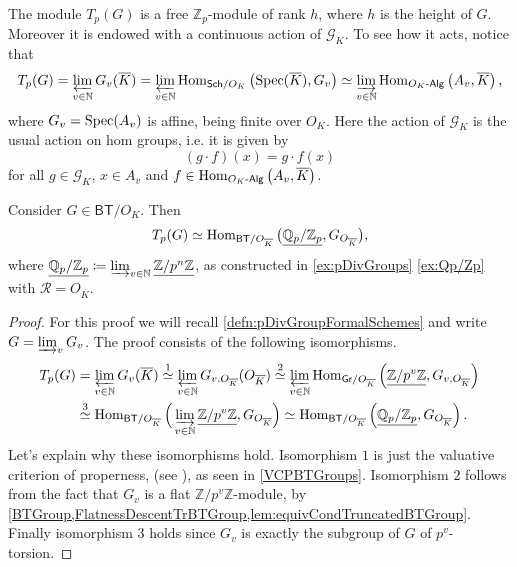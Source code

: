\begin{rem}[]\label{rem:TateModuleProperties}
	The module $T_p(G)$ is a free $\mathbb{Z}_{p}$-module of rank $h$,
	where $h$ is the height of $G$.
	Moreover it is endowed with a continuous action of $\mathscr{G}_K$.
	To see how it acts, notice that
	\begin{equation*}
		T_p(G) = \varprojlim_{v \in \mathbb{N}} G_v(\overline{K}) =
		\varprojlim_{v \in \mathbb{N}} \operatorname{Hom}_{ \mathsf{Sch}/O_K } 
		\left( \operatorname{Spec}(\overline{K}), G_v \right) \simeq
		\varinjlim_{v \in \mathbb{N}} \operatorname{Hom}_{ O_K\text{-}\mathsf{Alg} }
		\left( A_v, \overline{K} \right)
	,\end{equation*}
	where $G_v = \operatorname{Spec}(A_v)$ is affine, being finite over $O_K$.
	Here the action of $\mathscr{G}_K$ is the usual action on hom
	groups, i.e$.$ it is given by
	\begin{equation*}
		\left( g \cdot f \right)(x) = g \cdot f(x)
	\end{equation*}
	for all $g \in \mathscr{G}_K$, $x \in A_v$ and $f \in \operatorname{Hom}_{ O_K\text{-}\mathsf{Alg} } 
	\left( A_v, \overline{K}\right)$.
\end{rem}


\begin{prop}[]\label{AlternativeDefnTateModule}
	Consider $G \in \mathsf{BT}/O_K$.
	Then
	\begin{equation*}
		T_p(G) \simeq \operatorname{Hom}_{ \mathsf{BT}/O_{\overline{K}} }
		\big( \underline{\mathbb{Q}_p/\mathbb{Z}_{p}}, G_{O_{\overline{K}}} \big)
	,\end{equation*}
	where $\underline{\mathbb{Q}_p/\mathbb{Z}_{p}} \coloneqq \varinjlim_{v \in \mathbb{N}}
	\underline{\mathbb{Z}/p^n\mathbb{Z}}$, as constructed 
	in \cref{ex:pDivGroups} \cref{ex:Qp/Zp} with $\mathscr{R} = O_{\overline{K}}$.
\end{prop}
\begin{proof}
	For this proof we will recall \cref{defn:pDivGroupFormalSchemes}
	and write $G = \varinjlim_v G_v$.
	The proof consists of the following isomorphisms.
	\begin{align*}
		T_p(G) &= \varprojlim_{v \in \mathbb{N}} G_v(\overline{K})
		\stackrel{1}{\simeq} \varprojlim_{v \in \mathbb{N}} G_{ v,O_{\overline{K}}}(O_{\overline{K}})
		\stackrel{2}{\simeq} \varprojlim_{v \in \mathbb{N}}
		\operatorname{Hom}_{ \mathsf{Gr}/O_{\overline{K}} }
		\left( \underline{\mathbb{Z}/p^v\mathbb{Z}}, G_{ v,O_{\overline{K}}} \right) \\
		&\stackrel{3}{\simeq} 
		\operatorname{Hom}_{ \mathsf{BT}/O_{\overline{K}} } 
		\Big( \varinjlim_{v \in \mathbb{N}} \underline{\mathbb{Z}/p^v\mathbb{Z}}, G_{O_{\overline{K}}} \Big)
		\simeq \operatorname{Hom}_{ \mathsf{BT}/O_{\overline{K}} } 
		\left( \underline{\mathbb{Q}_p/\mathbb{Z}_{p}}, G_{O_{\overline{K}}} \right)
	.\end{align*}
	Let's explain why these isomorphisms hold.
	Isomorphism $1$ is just 
	the valuative criterion of properness,
	(see \cite[Chapter II, theorem 4.7]{Hartshorne}),
	as seen in \cref{VCPBTGroups}.
	Isomorphism $2$ follows from the fact that $G_v$ is
	a flat $\mathbb{Z}/p^v\mathbb{Z}$-module, by 
	\cref{BTGroup,FlatnessDescentTrBTGroup,lem:equivCondTruncatedBTGroup}.
	Finally isomorphism $3$ holds since $G_v$ is exactly the
	subgroup of $G$ of $p^v$-torsion.
\end{proof}



